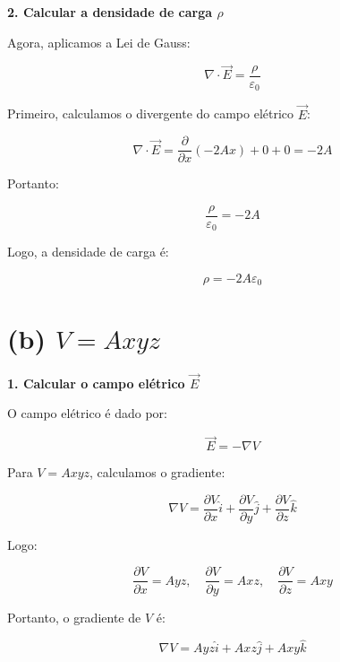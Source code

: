 \documentclass[a4paper,12pt]{article}
\begin{document}
\begin{flushleft}
\textbf{2. Calcular a densidade de carga \( \rho \)}

Agora, aplicamos a Lei de Gauss:

\begin{equation}
\boxed{\nabla \cdot \vec{E} = \frac{\rho}{\varepsilon_0}}
\end{equation}

Primeiro, calculamos o divergente do campo elétrico \( \vec{E} \):

\begin{equation}
\nabla \cdot \vec{E} = \frac{\partial}{\partial x} (-2 A x) + 0 + 0 = -2 A
\end{equation}

Portanto:

\begin{equation}
\frac{\rho}{\varepsilon_0} = -2 A
\end{equation}

Logo, a densidade de carga é:

\begin{equation}
\boxed{\rho = -2 A \varepsilon_0}
\end{equation}

\section*{(b) \( V = A x y z \)}

\textbf{1. Calcular o campo elétrico \( \vec{E} \)}

O campo elétrico é dado por:

\begin{equation}
\boxed{\vec{E} = -\nabla V}
\end{equation}

Para \( V = A x y z \), calculamos o gradiente:

\begin{equation}
\nabla V = \frac{\partial V}{\partial x} \hat{i} + \frac{\partial V}{\partial y} \hat{j} + \frac{\partial V}{\partial z} \hat{k}
\end{equation}

Logo:

\begin{equation}
\frac{\partial V}{\partial x} = A y z, \quad \frac{\partial V}{\partial y} = A x z, \quad \frac{\partial V}{\partial z} = A x y
\end{equation}

Portanto, o gradiente de \( V \) é:

\begin{equation}
\nabla V = A y z \hat{i} + A x z \hat{j} + A x y \hat{k}
\end{equation}


\end{flushleft}
\end{document}
